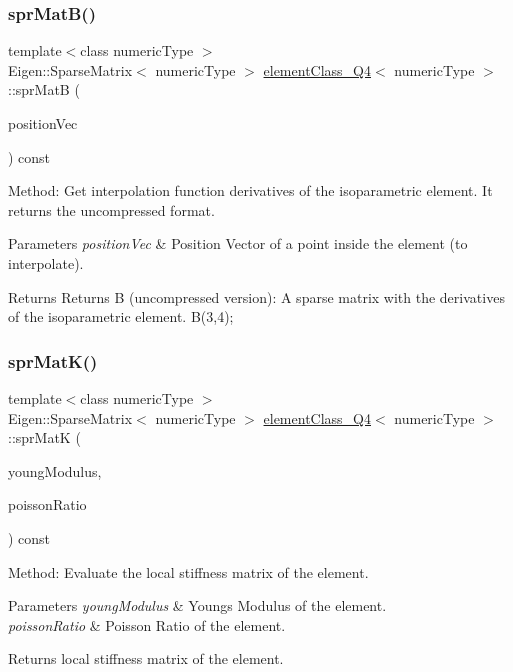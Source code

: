 \subsubsection{\texorpdfstring{spr\+Mat\+B()}{sprMatB()}}
{\footnotesize\ttfamily template$<$class numeric\+Type $>$ \\
Eigen\+::\+Sparse\+Matrix$<$ numeric\+Type $>$ \mbox{\hyperlink{classelement_class___q4}{element\+Class\+\_\+\+Q4}}$<$ numeric\+Type $>$\+::spr\+MatB (\begin{DoxyParamCaption}\item[{const Matrix$<$ numeric\+Type, 2, 1 $>$ \&}]{position\+Vec }\end{DoxyParamCaption}) const}

Method\+: Get interpolation function derivatives of the isoparametric element. It returns the uncompressed format. 
\begin{DoxyParams}{Parameters}
{\em position\+Vec} & Position Vector of a point inside the element (to interpolate). \\
\hline
\end{DoxyParams}
\begin{DoxyReturn}{Returns}
Returns B (uncompressed version)\+: A sparse matrix with the derivatives of the isoparametric element. B(3,4); 
\end{DoxyReturn}
\mbox{\label{classelement_class___q4_afcfb65b64fe9909300405219739ed496}} 
\subsubsection{\texorpdfstring{spr\+Mat\+K()}{sprMatK()}}
{\footnotesize\ttfamily template$<$class numeric\+Type $>$ \\
Eigen\+::\+Sparse\+Matrix$<$ numeric\+Type $>$ \mbox{\hyperlink{classelement_class___q4}{element\+Class\+\_\+\+Q4}}$<$ numeric\+Type $>$\+::spr\+MatK (\begin{DoxyParamCaption}\item[{numeric\+Type}]{young\+Modulus,  }\item[{numeric\+Type}]{poisson\+Ratio }\end{DoxyParamCaption}) const}

Method\+: Evaluate the local stiffness matrix of the element. 
\begin{DoxyParams}{Parameters}
{\em young\+Modulus} & Young\textquotesingle{}s Modulus of the element. \\
\hline
{\em poisson\+Ratio} & Poisson Ratio of the element. \\
\hline
\end{DoxyParams}
\begin{DoxyReturn}{Returns}
local stiffness matrix of the element. 
\end{DoxyReturn}
\mbox{\label{classelement_class___q4_adc47e0786349f327fe45e3744080d3c5}} 
